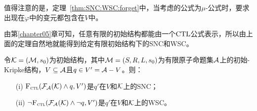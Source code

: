 值得注意的是，定理~\ref{thm:SNC:WSC:forget}中，当考虑的公式为$\mu$-公式时，要求出现在$\varphi$中的变元都包含在$V$中。

由第\ref{chapter05}章可知，任意有限的初始结构都能由一个$\textrm{CTL}$公式表示，所以由上面的定理自然地就能得到给定有限初始结构下的SNC和WSC。
\begin{corollary}\label{thm:inK:SNC}
	令${\cal K}= ({\cal M}, s_0)$为初始结构，其中${\cal M}=(S,R,L,s_0)$为有限原子命题集${\cal A}$上的初始-Kripke结构，$V \subseteq {\cal A}$且$q\in V' = {\cal A} - V$。则：
	\begin{itemize}
		\item[(i)] ${\textsc{F}_{\textsc{ctl}}}({\cal F}_{{\cal A}}({\cal K}) \wedge q, V')$是$q'$在$V$和${\cal K}$上的SNC；
		\item[(ii)] $\neg {\textsc{F}_{\textsc{ctl}}}({\cal F}_{{\cal A}}({\cal K}) \wedge \neg q, V')$是$q'$在$V$和${\cal K}$上的WSC。
	\end{itemize}
\end{corollary}

